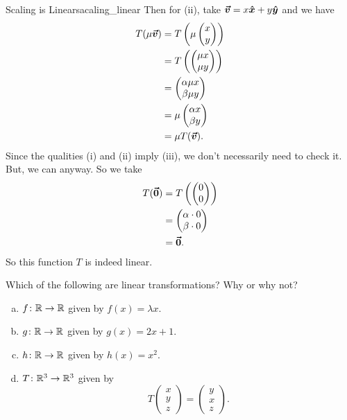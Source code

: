 \begin{ex}{Scaling is Linear}{sacaling_linear}
        Then for (ii), take $\boldsymbol{\boldsymbol{\vec{v}}} = x\boldsymbol{\hat{x}} + y\boldsymbol{\hat{y}}$ and we have
        \begin{align*}
            T(\mu \boldsymbol{\boldsymbol{\vec{v}}})&=T\left(\mu \begin{pmatrix} x \\ y \end{pmatrix}\right)\\
            &=T\left( \begin{pmatrix} \mu x \\ \mu y \end{pmatrix}\right)\\
            &= \begin{pmatrix} \alpha \mu x \\ \beta \mu y \end{pmatrix}\\
            &= \mu \begin{pmatrix} \alpha x \\ \beta y \end{pmatrix}\\
            &= \mu T(\boldsymbol{\boldsymbol{\vec{v}}}).
        \end{align*}
        Since the qualities (i) and (ii) imply (iii), we don't necessarily need to check it. But, we can anyway. So we take
        \begin{align*}
            T(\boldsymbol{\vec{0}})&= T\left(\begin{pmatrix} 0 \\ 0  \end{pmatrix}\right)\\
            &= \begin{pmatrix} \alpha \cdot 0 \\ \beta \cdot 0\end{pmatrix}\\
            &= \boldsymbol{\vec{0}}.
        \end{align*}
        So this function $T$ is indeed linear.
        \end{ex}
        
        \begin{exercise}
        Which of the following are linear transformations? Why or why not?
        \begin{enumerate}[(a)]
            \item $f\colon \mathbb{R} \to \mathbb{R}$ given by $f(x)=\lambda x$.
            \item $g\colon \mathbb{R} \to \mathbb{R}$ given by $g(x)=2x+1.$
            \item $h\colon \mathbb{R} \to \mathbb{R}$ given by $h(x)=x^2.$
            \item $T \colon \mathbb{R}^3 \to \mathbb{R}^3$ given by
            \[
            T \begin{pmatrix} x\\ y\\ z \end{pmatrix}  = \begin{pmatrix} y\\ x\\ z \end{pmatrix}.
            \]
        \end{enumerate}
        \end{exercise}
        
